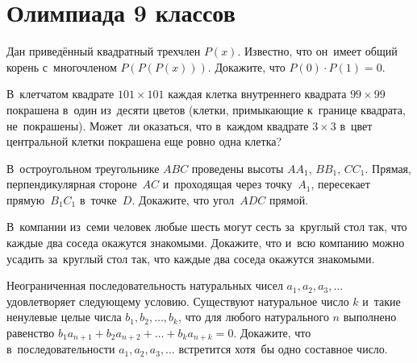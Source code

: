 
\section*{Олимпиада 9 классов}


\begin{problems}

\item
Дан приведённый квадратный трехчлен $P(x)$.
Известно, что он~имеет общий корень с~многочленом $P(P(P(x)))$.
Докажите, что $P(0) \cdot P(1) = 0$.

\item
В~клетчатом квадрате $101 \times 101$ каждая клетка внутреннего квадрата
$99 \times 99$ покрашена в~один из~десяти цветов (клетки, примыкающие к~границе
квадрата, не~покрашены).
Может~ли оказаться, что в~каждом квадрате $3 \times 3$ в~цвет центральной
клетки покрашена еще ровно одна клетка?

\item
В~остроугольном треугольнике $ABC$ проведены высоты $A A_1$, $B B_1$, $C C_1$.
Прямая, перпендикулярная стороне~$AC$ и~проходящая через точку~$A_1$,
пересекает прямую~$B_1 C_1$ в~точке~$D$.
Докажите, что угол~$ADC$ прямой.

\item
В~компании из~семи человек любые шесть могут сесть за~круглый стол так, что
каждые два соседа окажутся знакомыми. 
Докажите, что и~всю компанию можно усадить за~круглый стол так, что каждые два
соседа окажутся знакомыми.

\item
Неограниченная последовательность натуральных чисел $a_1, a_2, a_3, \ldots$
удовлетворяет следующему условию.
Существуют натуральное число $k$ и~такие ненулевые целые числа
$b_1, b_2, \ldots, b_k$, что для любого натурального $n$ выполнено равенство
$b_1 a_{n+1} + b_2 a_{n+2} + \ldots + b_k a_{n+k} = 0$.
Докажите, что в~последовательности $a_1, a_2, a_3, \ldots$ встретится хотя~бы
одно составное число.

\end{problems}

